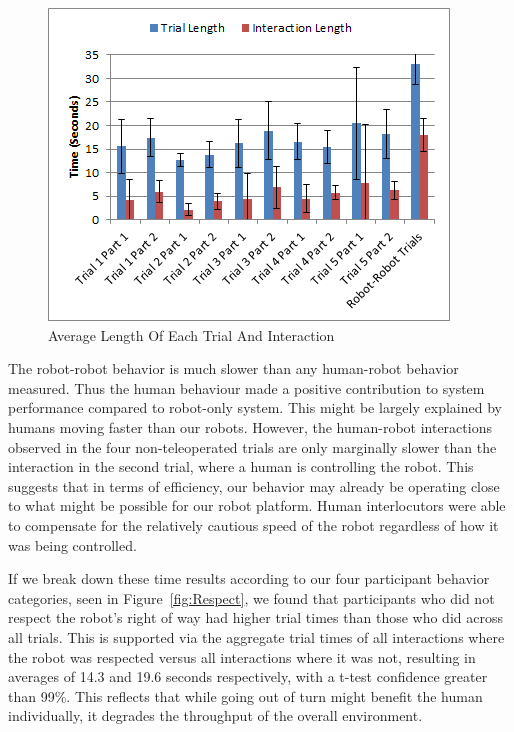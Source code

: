 \documentclass[letterpaper, 10 pt, conference]{ieeeconf}  %
\begin{document}
        \begin{figure}
      \centering
      \includegraphics{Interaction_Trial.png}
      \caption{Average Length Of Each Trial And Interaction}
      \label{fig:Trial_Interaction}
   \end{figure}

The robot-robot behavior is much slower than any human-robot behavior measured. Thus the human behaviour made a positive contribution to system performance compared to robot-only system. This might be largely explained by  humans moving faster than our robots. However, the human-robot interactions observed in the four non-teleoperated trials are only marginally slower than the interaction in the second trial, where a human is controlling the robot. This suggests that in terms of efficiency, our behavior may already be operating close to what might be possible for our robot platform. Human interlocutors were able to compensate for the relatively cautious speed of the robot regardless of how it was being controlled. 

If we break down these time results according to our four participant behavior categories, seen in Figure~\ref{fig:Respect}, we found that participants who did not respect the robot's right of way had higher trial times than those who did across all trials. This is supported via the aggregate trial times of all interactions where the robot was respected versus all interactions where it was not, resulting in averages of 14.3 and 19.6 seconds respectively, with a t-test confidence greater than 99\%.  This reflects that while going out of turn might benefit the human individually, it degrades the throughput of the overall environment. 
\end{document}

